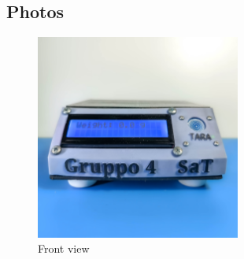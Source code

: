 \subsection{Photos}
\begin{figure}[H]
    \centering
    \includegraphics[width=0.6\textwidth]{medias/photos/front.jpg}
    \caption{Front view}
    \label{fig:immagine}
\end{figure}



